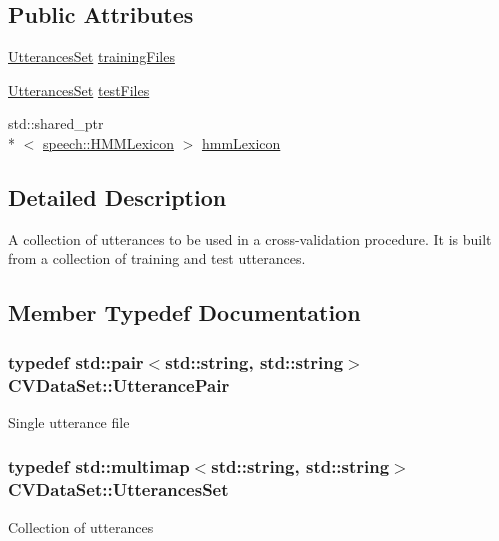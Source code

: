 \subsection*{Public Attributes}
\begin{DoxyCompactItemize}
\item 
\hyperlink{structCVDataSet_a1a8ca580cc2dde6a91fb66c82e00b747}{Utterances\+Set} \hyperlink{structCVDataSet_ada9a89e03d407ce7e7164ea1327e6f67}{training\+Files}
\item 
\hyperlink{structCVDataSet_a1a8ca580cc2dde6a91fb66c82e00b747}{Utterances\+Set} \hyperlink{structCVDataSet_ad1c35b1bb525b6237f8e15d1f044cd30}{test\+Files}
\item 
std\+::shared\+\_\+ptr\\*
$<$ \hyperlink{classspeech_1_1HMMLexicon}{speech\+::\+H\+M\+M\+Lexicon} $>$ \hyperlink{structCVDataSet_a662cfb97a8b9fbfb9fd7ee1624f418d1}{hmm\+Lexicon}
\end{DoxyCompactItemize}


\subsection{Detailed Description}
A collection of utterances to be used in a cross-\/validation procedure. It is built from a collection of training and test utterances. 

\subsection{Member Typedef Documentation}
\hypertarget{structCVDataSet_a39298839ccc861d9828d8fe2d1915110}{
\subsubsection[{Utterance\+Pair}]{\setlength{\rightskip}{0pt plus 5cm}typedef std\+::pair$<$std\+::string, std\+::string$>$ {\bf C\+V\+Data\+Set\+::\+Utterance\+Pair}}}\label{structCVDataSet_a39298839ccc861d9828d8fe2d1915110}
Single utterance file \hypertarget{structCVDataSet_a1a8ca580cc2dde6a91fb66c82e00b747}{
\subsubsection[{Utterances\+Set}]{\setlength{\rightskip}{0pt plus 5cm}typedef std\+::multimap$<$std\+::string, std\+::string$>$ {\bf C\+V\+Data\+Set\+::\+Utterances\+Set}}}\label{structCVDataSet_a1a8ca580cc2dde6a91fb66c82e00b747}
Collection of utterances 

